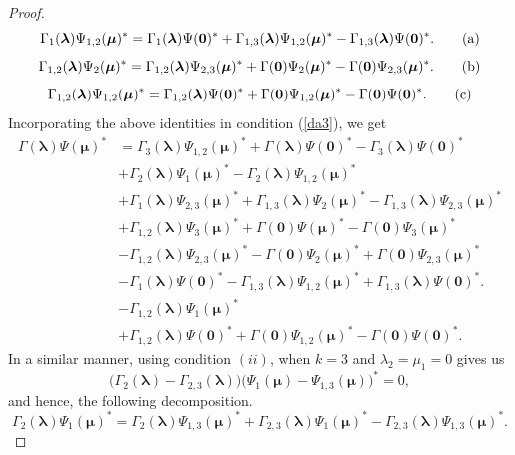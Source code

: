 \documentclass[12pt]{amsart}
\theoremstyle{definition}
\newcommand{\1}{{\mbox{\bf 1}}}
\begin{document}
\begin{proof}
\[
\Gamma_1(\bm{\lambda})\Psi_{1,2}(\bm{\mu})^* =  \Gamma_1(\bm{\lambda}) \Psi(\bm{0})^* +  \Gamma_{1,3}(\bm{\lambda}) \Psi_{1,2}(\bm{\mu})^* - \Gamma_{1,3}(\bm{\lambda}) \Psi(\bm{0})^*. \tag{\text{a}}
\]
\[
\Gamma_{1,2}(\bm{\lambda}) \Psi_{2}(\bm{\mu})^* =   \Gamma_{1,2}(\bm{\lambda}) \Psi_{2,3}(\bm{\mu})^* + \Gamma(\bm{0}) \Psi_{2}(\bm{\mu})^* - \Gamma(\bm{0}) \Psi_{2,3}(\bm{\mu})^*. \tag{\text{b}}
\]
\[
\Gamma_{1,2}(\bm{\lambda})  \Psi_{1,2}(\bm{\mu})^* = \Gamma_{1,2}(\bm{\lambda}) \Psi(\bm{0})^* + \Gamma(\bm{0}) \Psi_{1,2}(\bm{\mu})^* - \Gamma(\bm{0}) \Psi(\bm{0})^*. \tag{\text{c}}
\]
Incorporating the above identities in condition (\ref{da3}), we get
\begin{equation}\label{da4}
\begin{split}
\Gamma(\bm{\lambda})  \Psi(\bm{\mu})^* &=  \Gamma_3(\bm{\lambda}) \Psi_{1,2}(\bm{\mu})^* + \Gamma(\bm{\lambda}) \Psi(\bm{0})^* - \Gamma_3(\bm{\lambda}) \Psi(\bm{0})^* \\
&+ \Gamma_2(\bm{\lambda}) \Psi_1(\bm{\mu})^* - \Gamma_2(\bm{\lambda}) \Psi_{1,2}(\bm{\mu})^* \\
&+ \Gamma_1(\bm{\lambda})  \Psi_{2,3}(\bm{\mu})^* +  \Gamma_{1,3}(\bm{\lambda}) \Psi_{2}(\bm{\mu})^* - \Gamma_{1,3}(\bm{\lambda}) \Psi_{2,3}(\bm{\mu})^* \\
&+ \Gamma_{1,2}(\bm{\lambda})\Psi_{3}(\bm{\mu})^* + \Gamma(\bm{0})\Psi(\bm{\mu})^* - \Gamma(\bm{0})  \Psi_{3}(\bm{\mu})^*\\
&- \Gamma_{1,2}(\bm{\lambda}) \Psi_{2,3}(\bm{\mu})^* - \Gamma(\bm{0}) \Psi_{2}(\bm{\mu})^* + \Gamma(\bm{0}) \Psi_{2,3}(\bm{\mu})^* \\
&- \Gamma_1(\bm{\lambda}) \Psi(\bm{0})^* - \Gamma_{1,3}(\bm{\lambda}) \Psi_{1,2}(\bm{\mu})^* + \Gamma_{1,3}(\bm{\lambda}) \Psi(\bm{0})^*.\\
&- \Gamma_{1,2}(\bm{\lambda})  \Psi_{1}(\bm{\mu})^* \\
&+ \Gamma_{1,2}(\bm{\lambda}) \Psi(\bm{0})^* + \Gamma(\bm{0}) \Psi_{1,2}(\bm{\mu})^* - \Gamma(\bm{0}) \Psi(\bm{0})^*.
\end{split}
\end{equation}
In a similar manner, using condition $(ii)$, when $k=3$ and $\lambda_2 = \mu_1 = 0$ gives us 
\[
\big( \Gamma_{2}(\bm{\lambda}) - \Gamma_{2,3}(\bm{\lambda}) \big) \big( \Psi_1(\bm{\mu}) - \Psi_{1,3}(\bm{\mu}) \big)^* = 0,
\]
and hence,  the following decomposition.
\[
\Gamma_2(\bm{\lambda}) \Psi_{1}(\bm{\mu})^* =  \Gamma_2(\bm{\lambda})\Psi_{1,3}(\bm{\mu})^* + \Gamma_{2,3}(\bm{\lambda}) \Psi_{1}(\bm{\mu})^* - \Gamma_{2,3}(\bm{\lambda}) \Psi_{1,3}(\bm{\mu})^*. 
\]
\end{proof}
\end{document}
